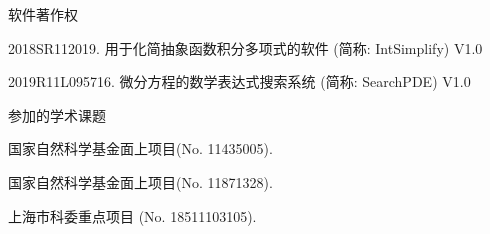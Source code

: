 \noindent 软件著作权
\begin{enumerate}[label={[\arabic*]},leftmargin=*]
\item 2018SR112019. 用于化简抽象函数积分多项式的软件 (简称: IntSimplify) V1.0
\item 2019R11L095716. 微分方程的数学表达式搜索系统 (简称: SearchPDE) V1.0
\end{enumerate}

\noindent 参加的学术课题
\begin{enumerate}[label={[\arabic*]},leftmargin=*]
\item 国家自然科学基金面上项目(No. 11435005).
\item 国家自然科学基金面上项目(No. 11871328).
\item 上海市科委重点项目 (No. 18511103105). 
\end{enumerate}
\fi
